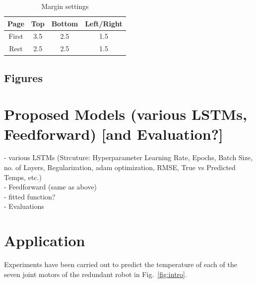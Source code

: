 \documentclass{ifacconf}
\begin{document}
\begin{table}[hb]
  \begin{center}
  \caption{Margin settings}\label{tb:margins}
  \begin{tabular}{cccc}
  Page & Top & Bottom & Left/Right \\\hline
  First & 3.5 & 2.5 & 1.5 \\
  Rest & 2.5 & 2.5 & 1.5 \\ \hline
  \end{tabular}
  \end{center}
  \end{table}
\subsection{Figures}



\section{Proposed Models (various LSTMs, Feedforward) [and Evaluation?]}
- various LSTMs (Strcuture: Hyperparameter {Learning Rate, Epochs, Batch Size, no. of Layers, Regularization, adam optimization}, RMSE, True vs Predicted Temps, etc.)\\
- Feedforward (same as above)\\
- fitted function?\\
- Evaluations


\section{Application}
Experiments have been carried out to predict the temperature of each of the seven joint motors of the redundant robot in Fig.~\ref{fig:intro}. 
\end{document}

